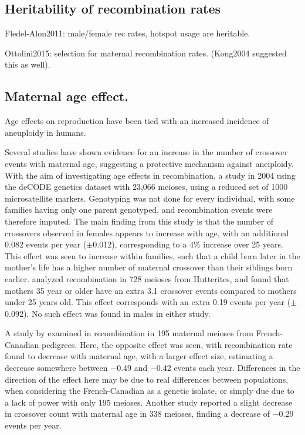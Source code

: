 \subsection{Heritability of recombination rates}
Fledel-Alon2011: male/female rec rates, hotspot usage are heritable.

Ottolini2015: selection for maternal recombination rates. (Kong2004 suggested this as well).

\subsection{Maternal age effect.}

Age effects on reproduction have been tied with an increased incidence of aneuploidy in humans\cite{Hassold2001,*}.

Several studies have shown evidence for an increase in the number of crossover events with maternal age, suggesting a protective mechanism against aneiploidy.
With the aim of investigating age effects in recombination, a study in 2004 using the deCODE genetics dataset with 23,066 meioses, using a reduced set of 1000 microsatellite markers\cite{Kong2004}.
Genotyping was not done for every individual, with some families having only one parent genotyped, and recombination events were therefore imputed.
The main finding from this study is that the number of crossovers observed in females appears to increase with age, with an additional 0.082 events per year ($\pm$0.012), corresponding to a 4\% increase over 25 years.
This effect was seen to increase within families, such that a child born later in the mother's life has a higher number of maternal crossover than their siblings born earlier.
\citet{Coop2008} analyzed recombination in 728 meioses from Hutterites, and found that mothers 35 year or older have an extra 3.1 crossover events compared to mothers under 25 years old.
This effect corresponds with an extra 0.19 events per year ($\pm$0.092).
No such effect was found in males in either study.

A study by \citet{Hussin2011} examined in recombination in 195 maternal meioses from French-Canadian pedigrees.
Here, the opposite effect was seen, with recombination rate found to decrease with maternal age, with a larger effect size, estimating a decrease somewhere between $-$0.49 and $-$0.42 events each year.
Differences in the direction of the effect here may be due to real differences between populations, when considering the French-Canadian as a genetic isolate, or simply due due to a lack of power with only 195 meioses.
Another study reported a slight decrease in crossover count with maternal age in 338 meioses, finding a decrease of $-$0.29 events per year\cite{Bleazard2013}.

